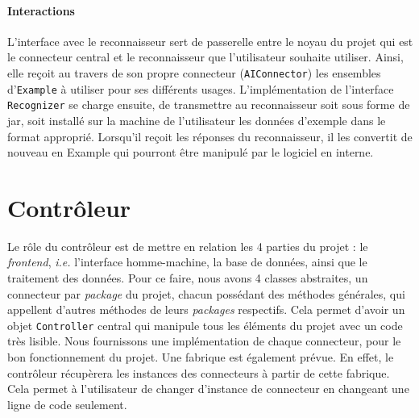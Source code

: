 \paragraph{Interactions}
L'interface avec le reconnaisseur sert de passerelle entre le noyau du projet qui est le connecteur central et le reconnaisseur que l'utilisateur souhaite utiliser. Ainsi, elle reçoit au travers de son propre connecteur (\texttt{AIConnector}) les ensembles d'\texttt{Example} à utiliser pour ses différents usages. L'implémentation de l'interface \texttt{Recognizer} se charge ensuite, de transmettre au reconnaisseur soit sous forme de jar, soit installé sur la machine de l'utilisateur les données d'exemple dans le format approprié. Lorsqu'il reçoit les réponses du reconnaisseur, il les convertit de nouveau en Example qui pourront être manipulé par le logiciel en interne.

\section{Contrôleur}

Le rôle du contrôleur est de mettre en relation les 4 parties du projet : le \textit{frontend}, \textit{i.e.} l'interface homme-machine, la base de données, ainsi que le traitement des données. Pour ce faire, nous avons 4 classes abstraites, un connecteur par \textit{package} du projet, chacun possédant des méthodes générales, qui appellent d'autres méthodes de leurs \textit{packages} respectifs. Cela permet d'avoir un objet \texttt{Controller} central qui manipule tous les éléments du projet avec un code très lisible. Nous fournissons une implémentation de chaque connecteur, pour le bon fonctionnement du projet. Une fabrique est également prévue. En effet, le contrôleur récupèrera les instances des connecteurs à partir de cette fabrique. Cela permet à l'utilisateur de changer d'instance de connecteur en changeant une ligne de code seulement.